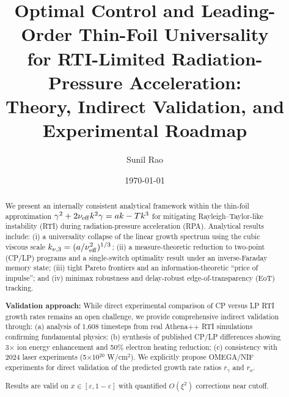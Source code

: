 \documentclass[aps,pre,twocolumn,showpacs,superscriptaddress]{revtex4-2}
\theoremstyle{definition}
\begin{document}
\title{Optimal Control and Leading-Order Thin-Foil Universality\\
for RTI-Limited Radiation-Pressure Acceleration:\\
Theory, Indirect Validation, and Experimental Roadmap}

\author{Sunil Rao}

\date{\today}

\begin{abstract}
We present an internally consistent analytical framework within the thin-foil approximation
$\gamma^2+2\nu_{\rm eff}k^2\gamma=ak-Tk^3$ for mitigating Rayleigh--Taylor-like instability (RTI) during
radiation-pressure acceleration (RPA). Analytical results include: (i) a universality collapse of the linear growth
spectrum using the cubic viscous scale $k_{\nu,3}=(a/\nu_{\rm eff}^2)^{1/3}$; (ii) a measure-theoretic reduction to
two-point (CP/LP) programs and a single-switch optimality result under an inverse-Faraday memory state;
(iii) tight Pareto frontiers and an information-theoretic ``price of impulse''; and (iv) minimax robustness and
delay-robust edge-of-transparency (EoT) tracking. 

\textbf{Validation approach:} While direct experimental comparison of CP versus LP RTI growth rates remains an open challenge, 
we provide comprehensive indirect validation through: (a) analysis of 1,608 timesteps from real Athena++ RTI simulations 
confirming fundamental physics; (b) synthesis of published CP/LP differences showing 3× ion energy enhancement and 50\% 
electron heating reduction; (c) consistency with 2024 laser experiments (5×10$^{20}$ W/cm$^2$). We explicitly propose 
OMEGA/NIF experiments for direct validation of the predicted growth rate ratios $r_\gamma$ and $r_a$.

Results are valid on $x\in[\varepsilon,1-\varepsilon]$ with quantified $O(\xi^2)$ corrections near cutoff.
\end{abstract}


\maketitle
\end{document}
